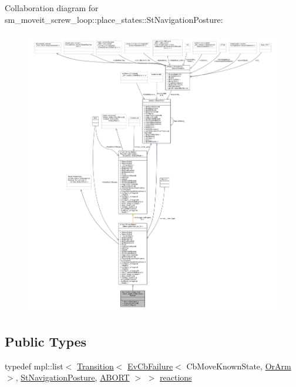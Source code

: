 Collaboration diagram for sm\+\_\+moveit\+\_\+screw\+\_\+loop\+:\+:place\+\_\+states\+:\+:St\+Navigation\+Posture\+:
\nopagebreak
\begin{figure}[H]
\begin{center}
\leavevmode
\includegraphics[width=350pt]{structsm__moveit__screw__loop_1_1place__states_1_1StNavigationPosture__coll__graph}
\end{center}
\end{figure}
\subsection*{Public Types}
\begin{DoxyCompactItemize}
\item 
typedef mpl\+::list$<$ \hyperlink{classsmacc_1_1Transition}{Transition}$<$ \hyperlink{structsmacc_1_1EvCbFailure}{Ev\+Cb\+Failure}$<$ Cb\+Move\+Known\+State, \hyperlink{classsm__moveit__screw__loop_1_1OrArm}{Or\+Arm} $>$, \hyperlink{structsm__moveit__screw__loop_1_1place__states_1_1StNavigationPosture}{St\+Navigation\+Posture}, \hyperlink{structsmacc_1_1default__transition__tags_1_1ABORT}{A\+B\+O\+RT} $>$ $>$ \hyperlink{structsm__moveit__screw__loop_1_1place__states_1_1StNavigationPosture_a48e9b1c89bd8579e8adad0e218794b04}{reactions}
\end{DoxyCompactItemize}
